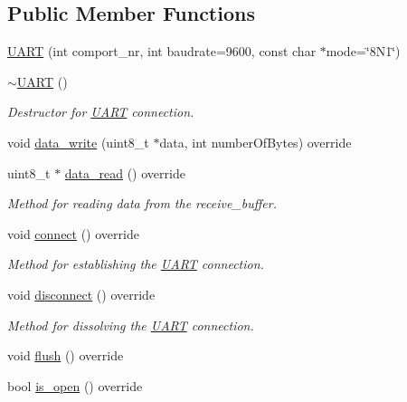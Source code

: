 \subsection*{Public Member Functions}
\begin{DoxyCompactItemize}
\item 
\hyperlink{class_u_a_r_t_a2912097d50627bf539e3247845ceb899}{U\+A\+R\+T} (int comport\+\_\+nr, int baudrate=9600, const char $\ast$mode=\char`\"{}8\+N1\char`\"{})
\item 
\hypertarget{class_u_a_r_t_a79aea29bd989d2e2ce9692042375b83e}{}\hyperlink{class_u_a_r_t_a79aea29bd989d2e2ce9692042375b83e}{$\sim$\+U\+A\+R\+T} ()\label{class_u_a_r_t_a79aea29bd989d2e2ce9692042375b83e}

\begin{DoxyCompactList}\small\item\em Destructor for \hyperlink{class_u_a_r_t}{U\+A\+R\+T} connection. \end{DoxyCompactList}\item 
void \hyperlink{class_u_a_r_t_ad03f74b9d5181ed48aef24a93508c31c}{data\+\_\+write} (uint8\+\_\+t $\ast$data, int number\+Of\+Bytes) override
\item 
\hypertarget{class_u_a_r_t_a199246f2e9b7d430c30aefd36230321f}{}uint8\+\_\+t $\ast$ \hyperlink{class_u_a_r_t_a199246f2e9b7d430c30aefd36230321f}{data\+\_\+read} () override\label{class_u_a_r_t_a199246f2e9b7d430c30aefd36230321f}

\begin{DoxyCompactList}\small\item\em Method for reading data from the receive\+\_\+buffer. \end{DoxyCompactList}\item 
\hypertarget{class_u_a_r_t_a0ec2cd830665a221b6cd3355cc7ef0e2}{}void \hyperlink{class_u_a_r_t_a0ec2cd830665a221b6cd3355cc7ef0e2}{connect} () override\label{class_u_a_r_t_a0ec2cd830665a221b6cd3355cc7ef0e2}

\begin{DoxyCompactList}\small\item\em Method for establishing the \hyperlink{class_u_a_r_t}{U\+A\+R\+T} connection. \end{DoxyCompactList}\item 
\hypertarget{class_u_a_r_t_a85257ba6ca852314fae7b0c4dd5650c3}{}void \hyperlink{class_u_a_r_t_a85257ba6ca852314fae7b0c4dd5650c3}{disconnect} () override\label{class_u_a_r_t_a85257ba6ca852314fae7b0c4dd5650c3}

\begin{DoxyCompactList}\small\item\em Method for dissolving the \hyperlink{class_u_a_r_t}{U\+A\+R\+T} connection. \end{DoxyCompactList}\item 
void \hyperlink{class_u_a_r_t_ac34a3da482eafe1e32f3b2111a910d2a}{flush} () override
\item 
\hypertarget{class_u_a_r_t_a5551a0313999a799a948b80a407d1e2f}{}bool \hyperlink{class_u_a_r_t_a5551a0313999a799a948b80a407d1e2f}{is\+\_\+open} () override\label{class_u_a_r_t_a5551a0313999a799a948b80a407d1e2f}


\end{DoxyCompactItemize}

